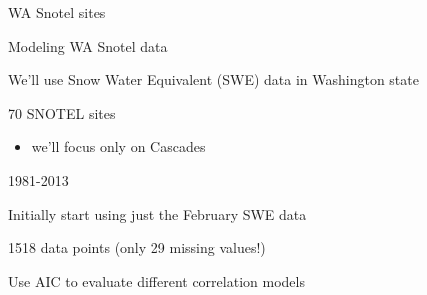 \documentclass[ignorenonframetext,]{beamer}
\newenvironment{Shaded}{\begin{snugshade}}{\end{snugshade}}
\newcommand{\DataTypeTok}[1]{\textcolor[rgb]{0.13,0.29,0.53}{#1}}
\newcommand{\DecValTok}[1]{\textcolor[rgb]{0.00,0.00,0.81}{#1}}
\newcommand{\FloatTok}[1]{\textcolor[rgb]{0.00,0.00,0.81}{#1}}
\newcommand{\KeywordTok}[1]{\textcolor[rgb]{0.13,0.29,0.53}{\textbf{#1}}}
\newcommand{\NormalTok}[1]{#1}
\newcommand{\OperatorTok}[1]{\textcolor[rgb]{0.81,0.36,0.00}{\textbf{#1}}}
\newcommand{\StringTok}[1]{\textcolor[rgb]{0.31,0.60,0.02}{#1}}
\providecommand{\tightlist}{%
  \setlength{\itemsep}{0pt}\setlength{\parskip}{0pt}}
\begin{document}
\begin{frame}{WA Snotel sites}
\protect\hypertarget{wa-snotel-sites}{}

\end{frame}

\begin{frame}{Modeling WA Snotel data}
\protect\hypertarget{modeling-wa-snotel-data}{}

We'll use Snow Water Equivalent (SWE) data in Washington state

70 SNOTEL sites

\begin{itemize}
\tightlist
\item
  we'll focus only on Cascades
\end{itemize}

1981-2013

Initially start using just the February SWE data

1518 data points (only 29 missing values!)

\end{frame}

\begin{frame}[fragile]{Use AIC to evaluate different correlation models}
\protect\hypertarget{use-aic-to-evaluate-different-correlation-models}{}

\begin{Shaded}
\end{Shaded}

\end{frame}
\end{document}
